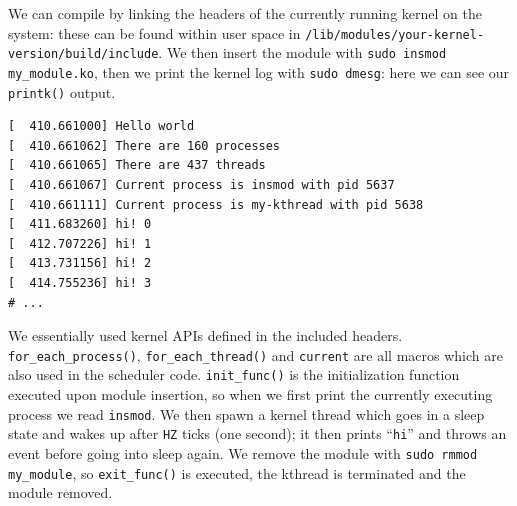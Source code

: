 We can compile by linking the headers of the currently running kernel on the system: these can be found within user space in \verb|/lib/modules/your-kernel-version/build/include|. We then insert the module with \verb|sudo insmod my_module.ko|, then we print the kernel log with \verb|sudo dmesg|: here we can see our \verb|printk()| output.
\begin{Verbatim}
[  410.661000] Hello world
[  410.661062] There are 160 processes
[  410.661065] There are 437 threads
[  410.661067] Current process is insmod with pid 5637
[  410.661111] Current process is my-kthread with pid 5638
[  411.683260] hi! 0
[  412.707226] hi! 1
[  413.731156] hi! 2
[  414.755236] hi! 3
# ...
\end{Verbatim}
We essentially used kernel APIs defined in the included headers. \verb|for_each_process()|, \verb|for_each_thread()| and \verb|current| are all macros which are also used in the scheduler code. \verb|init_func()| is the initialization function executed upon module insertion, so when we first print the currently executing process we read \verb|insmod|. We then spawn a kernel thread which goes in a sleep state and wakes up after \verb|HZ| ticks (one second); it then prints ``\texttt{hi}'' and throws an event before going into sleep again. We remove the module with \verb|sudo rmmod my_module|, so \verb|exit_func()| is executed, the kthread is terminated and the module removed.

